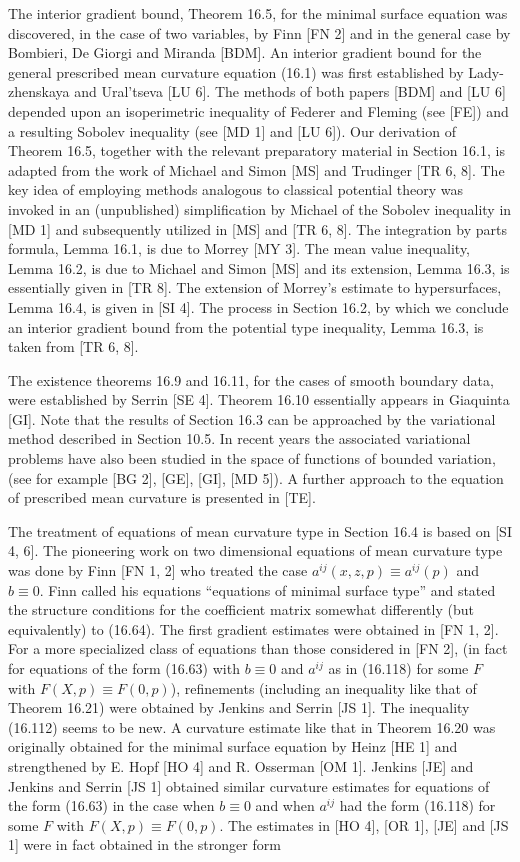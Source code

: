 The interior gradient bound, Theorem 16.5, for the minimal surface equation was
discovered, in the case of two variables, by Finn [FN 2] and in the general case by
Bombieri, De Giorgi and Miranda [BDM]. An interior gradient bound for the
general prescribed mean curvature equation (16.1) was first established by Lady-
zhenskaya and Ural'tseva [LU 6]. The methods of both papers [BDM] and [LU 6]
depended upon an isoperimetric inequality of Federer and Fleming (see [FE])
and a resulting Sobolev inequality (see [MD 1] and [LU 6]). Our derivation of
Theorem 16.5, together with the relevant preparatory material in Section 16.1, is
adapted from the work of Michael and Simon [MS] and Trudinger [TR 6, 8].
The key idea of employing methods analogous to classical potential theory was
invoked in an (unpublished) simplification by Michael of the Sobolev inequality
in [MD 1] and subsequently utilized in [MS] and [TR 6, 8]. The integration by
parts formula, Lemma 16.1, is due to Morrey [MY 3]. The mean value inequality,
Lemma 16.2, is due to Michael and Simon [MS] and its extension, Lemma 16.3,
is essentially given in [TR 8]. The extension of Morrey's estimate to hypersurfaces,
Lemma 16.4, is given in [SI 4]. The process in Section 16.2, by which we conclude
an interior gradient bound from the potential type inequality, Lemma 16.3, is
taken from [TR 6, 8].

The existence theorems 16.9 and 16.11, for the cases of smooth boundary data,
were established by Serrin [SE 4]. Theorem 16.10 essentially appears in Giaquinta
[GI]. Note that the results of Section 16.3 can be approached by the variational
method described in Section 10.5. In recent years the associated variational
problems have also been studied in the space of functions of bounded variation,
(see for example [BG 2], [GE], [GI], [MD 5]). A further approach to the equation
of prescribed mean curvature is presented in [TE].

The treatment of equations of mean curvature type in Section 16.4 is based on
[SI 4, 6]. The pioneering work on two dimensional equations of mean curvature
type was done by Finn [FN 1, 2] who treated the case $a^{ij}(x, z, p)\equiv a^{ij}(p)$ and
$b\equiv 0$. Finn called his equations ``equations of minimal surface type'' and stated
the structure conditions for the coefficient matrix somewhat differently (but
equivalently) to (16.64). The first gradient estimates were obtained in [FN 1, 2].
For a more specialized class of equations than those considered in [FN 2], (in
fact for equations of the form (16.63) with $b\equiv 0$ and $a^{ij}$ as in (16.118) for some $F$
with $F(X, p)\equiv F(0, p)$), refinements (including an inequality like that of Theorem
16.21) were obtained by Jenkins and Serrin [JS 1]. The inequality (16.112) seems
to be new. A curvature estimate like that in Theorem 16.20 was originally obtained
for the minimal surface equation by Heinz [HE 1] and strengthened by E. Hopf
[HO 4] and R. Osserman [OM 1]. Jenkins [JE] and Jenkins and Serrin [JS 1]
obtained similar curvature estimates for equations of the form (16.63) in the case
when $b\equiv 0$ and when $a^{ij}$ had the form (16.118) for some $F$ with $F(X, p)\equiv F(0, p)$.
The estimates in [HO 4], [OR 1], [JE] and [JS 1] were in fact obtained in the
stronger form

